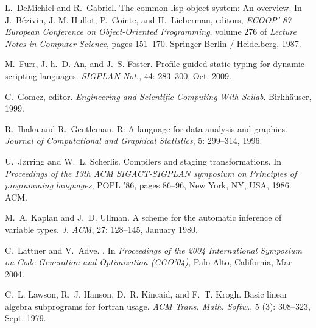 \documentclass[9pt]{sigplanconf}
\begin{document}
\begin{thebibliography}{27}
L.~DeMichiel and R.~Gabriel.
\newblock The common lisp object system: An overview.
\newblock In J.~Bézivin, J.-M. Hullot, P.~Cointe, and H.~Lieberman, editors,
  \emph{ECOOP’ 87 European Conference on Object-Oriented Programming}, volume
  276 of \emph{Lecture Notes in Computer Science}, pages 151--170. Springer
  Berlin / Heidelberg, 1987.

M.~Furr, J.-h.~D. An, and J.~S. Foster.
\newblock Profile-guided static typing for dynamic scripting languages.
\newblock \emph{SIGPLAN Not.}, 44: 283--300, Oct. 2009.

C.~Gomez, editor.
\newblock \emph{Engineering and Scientific Computing With Scilab}.
\newblock Birkh{\"a}user, 1999.

R.~Ihaka and R.~Gentleman.
\newblock R: A language for data analysis and graphics.
\newblock \emph{Journal of Computational and Graphical Statistics}, 5:
  299--314, 1996.

U.~J{\o}rring and W.~L. Scherlis.
\newblock Compilers and staging transformations.
\newblock In \emph{Proceedings of the 13th ACM SIGACT-SIGPLAN symposium on
  Principles of programming languages}, POPL '86, pages 86--96, New York, NY,
  USA, 1986. ACM.

M.~A. Kaplan and J.~D. Ullman.
\newblock A scheme for the automatic inference of variable types.
\newblock \emph{J. ACM}, 27: 128--145, January 1980.

C.~Lattner and V.~Adve.
.
\newblock In \emph{{Proceedings of the 2004 International Symposium on Code
  Generation and Optimization (CGO'04)}}, Palo Alto, California, Mar 2004.

C.~L. Lawson, R.~J. Hanson, D.~R. Kincaid, and F.~T. Krogh.
\newblock Basic linear algebra subprograms for fortran usage.
\newblock \emph{ACM Trans. Math. Softw.}, 5 (3): 308--323,
  Sept. 1979.


\end{thebibliography}
\end{document}
